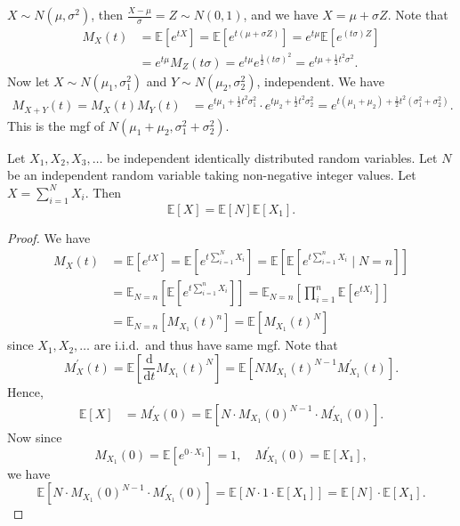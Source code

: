 \begin{eg}
    \(X \sim N(\mu , \sigma ^2) \), then \(\frac{X - \mu }{\sigma } = Z \sim N(0, 1)\), and we have \(X = \mu + \sigma Z\). Note that 
    \begin{align*}
        M_X(t) &= \mathbb{E} \left[ e^{tX} \right] = \mathbb{E} \left[ e^{t(\mu + \sigma Z)} \right] = e^{t \mu } \mathbb{E} \left[ e^{(t \sigma) Z} \right] \\
        &= e^{t \mu } M_Z(t \sigma ) = e^{t \mu } e^{\frac{1}{2} (t \sigma )^2} = e^{t \mu + \frac{1}{2} t^2 \sigma ^2}.   
    \end{align*}   
    Now let \(X \sim N(\mu _1, \sigma_1 ^2)\) and \(Y \sim N(\mu _2, \sigma _2^2)\), independent. We have 
    \begin{align*}
        M_{X + Y}(t) = M_X(t) M_Y(t) &= e^{t \mu _1 + \frac{1}{2} t^2 \sigma _1^2} \cdot e^{t \mu _2 + \frac{1}{2} t^2 \sigma _2^2} = e^{t(\mu _1 + \mu _2) + \frac{1}{2} t^2 (\sigma _1^2 + \sigma _2^2)} .
    \end{align*} 
    This is the mgf of \(N(\mu _1 + \mu _2, \sigma _1^2 + \sigma _2^2)\). 
\end{eg}

\begin{eg}
    Let \(X_1, X_2, X_3, \dots \) be independent identically distributed random variables. Let \(N\) be an independent random variable taking non-negative integer values. Let \(X = \sum_{i=1}^N X_i \). Then 
    \[
        \mathbb{E} [X] = \mathbb{E} [N] \mathbb{E} [X_1].
    \]   
\end{eg}
\begin{proof}
    We have 
    \begin{align*}
        M_X(t) &= \mathbb{E} [e^{tX}] = \mathbb{E} \left[ e^{t \sum_{i=1}^N X_i } \right] = \mathbb{E} \left[ \mathbb{E} \left[ e^{t \sum_{i=1}^n X_i } \mid N = n \right]  \right] \\
        &= \mathbb{E} _{N = n} \left[ \mathbb{E} \left[ e^{t \sum_{i=1}^n X_i } \right]  \right] = \mathbb{E}_{N = n} \left[ \prod _{i=1}^n \mathbb{E} [e^{tX_i}] \right] \\
        &= \mathbb{E} _{N = n} \left[ M_{X_1}(t)^n \right] = \mathbb{E} \left[ M_{X_1}(t)^N \right]      
    \end{align*}
    since \(X_1, X_2, \dots \) are i.i.d.\ and thus have same mgf. 
    Note that 
    \[
        M_X^{\prime} (t) = \mathbb{E} \left[ \frac{\mathrm{d}}{\mathrm{d}t} M_{X_1}(t)^N  \right] = \mathbb{E} \left[ N M_{X_1} (t)^{N - 1} M_{X_1}^{\prime} (t) \right]. 
    \]
    Hence,
    \begin{align*}
        \mathbb{E} [X] &= M_X^{\prime} (0) = \mathbb{E} \left[ N \cdot M_{X_1}(0)^{N - 1} \cdot M_{X_1}^{\prime} (0) \right].
    \end{align*}
    Now since 
    \[
        M_{X_1}(0) = \mathbb{E} [e^{0 \cdot X_1}] = 1, \quad M_{X_1}^{\prime} (0) = \mathbb{E} [X_1],
    \]
    we have 
    \[
       \mathbb{E} \left[ N \cdot M_{X_1}(0)^{N - 1} \cdot M_{X_1}^{\prime} (0) \right] = \mathbb{E} [N \cdot 1 \cdot \mathbb{E} [X_1]] = \mathbb{E} [N] \cdot \mathbb{E} [X_1]. 
    \]
\end{proof}

